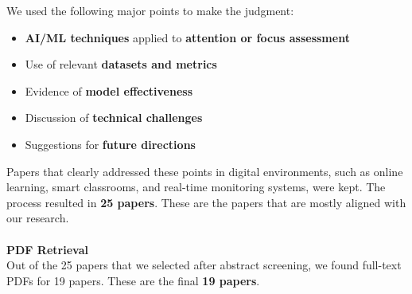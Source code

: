 \documentclass[12pt]{article}
\begin{document}
We used the following major points to make the judgment:
\begin{itemize}
    \item \textbf{AI/ML techniques} applied to \textbf{attention or focus assessment}
    \item Use of relevant \textbf{datasets and metrics}
    \item Evidence of \textbf{model effectiveness}
    \item Discussion of \textbf{technical challenges}
    \item Suggestions for \textbf{future directions}
\end{itemize}

Papers that clearly addressed these points in digital environments, such as online learning, smart classrooms, and real-time monitoring systems, were kept. The process resulted in \textbf{25 papers}. These are the papers that are mostly aligned with our research. \\ \\
\textbf{PDF Retrieval} \\ 
Out of the 25 papers that we selected after abstract screening, we found full-text PDFs for 19 papers. These are the final \textbf{19 papers}.\\ \\
\end{document}
